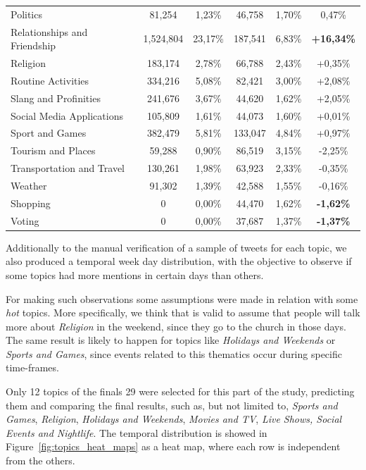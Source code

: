 \begin{table}[ht]
{\begin{tabular}{l|cc|cc|c}
		Politics & 81,254 & 1,23\% & 46,758 & 1,70\% & 0,47\% \\
		Relationships and Friendship & 1,524,804 & 23,17\% & 187,541 & 6,83\% & \textbf{+16,34\%} \\
		Religion & 183,174 & 2,78\% & 66,788 & 2,43\% & +0,35\% \\
		Routine Activities & 334,216 & 5,08\% & 82,421 & 3,00\% & +2,08\% \\
		Slang and Profinities & 241,676 & 3,67\% & 44,620 & 1,62\% & +2,05\% \\
		Social Media Applications & 105,809 & 1,61\% & 44,073 & 1,60\% & +0,01\% \\
		Sport and Games & 382,479 & 5,81\% & 133,047 & 4,84\% & +0,97\% \\
		Tourism and Places & 59,288 & 0,90\% & 86,519 & 3,15\% & -2,25\% \\
		Transportation and Travel & 130,261 & 1,98\% & 63,923 & 2,33\% & -0,35\% \\
		Weather & 91,302 & 1,39\% & 42,588 & 1,55\% & -0,16\% \\
		Shopping & 0 & 0,00\% & 44,470 & 1,62\% & \textbf{-1,62\%} \\
		Voting & 0 & 0,00\% & 37,687 & 1,37\% & \textbf{-1,37\%} \\ \hline
	\end{tabular}}
\end{table}
	
Additionally to the manual verification of a sample of tweets for each topic, we also produced a temporal week day distribution,  with the objective to observe if some topics had more mentions in certain days than others.

For making such observations some assumptions were made in relation with some \textit{hot} topics. More specifically, we think that is valid to assume that people will talk more about \textit{Religion} in the weekend, since they go to the church in those days. The same result is likely to happen for topics like \textit{Holidays and Weekends} or \textit{Sports and Games}, since events related to this thematics occur during specific time-frames. 

Only 12 topics of the finals 29 were selected for this part of the study, predicting them and comparing the final results, such as, but not limited to, \textit{Sports and Games}, \textit{Religion}, \textit{Holidays and Weekends}, \textit{Movies and TV}, \textit{Live Shows, Social Events and Nightlife}. The temporal distribution is showed in Figure~\ref{fig:topics_heat_maps} as a heat map, where each row is independent from the others.


